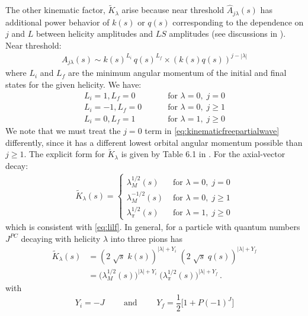 \documentclass[10pt, aps,prd,amsmath,amssymb,superscriptaddress,onecolumn,
nofootinbib,showpacs,preprintnumbers]{revtex4-1}
\newcommand{\mand}{\qquad \text{ and } \qquad}
\begin{document}
The other kinematic factor, \(\tilde{K}_{\lambda}\) arise  because near threshold \(\hat{A}_{j\lambda}(s)\) has additional power behavior of \(k(s)\) or \(q(s)\) corresponding to the dependence on \(j\) and \(L\) between helicity amplitudes and \(LS\) amplitudes (see discussions in \cite{Jackson1968,Franklin1966}). Near threshold:
  \begin{gather}
    A_{j\lambda}(s) \sim k(s)^{L_i} \, q(s)^{L_f} \times (k(s)q(s))^{j- |\lambda|}
  \end{gather}
where \(L_i\) and \(L_f\) are the minimum angular momentum of the initial and final states for the given helicity. We have:
  \begin{align}
      L_i = 1, L_f = 0 &\qquad  \text{ for } \lambda = 0, \; j = 0   \nonumber \\
      L_i = -1, L_f = 0 &\qquad  \text{ for } \lambda = 0, \;  j \label{eq:lilf} \geq 1  \\
      L_i = 0 , L_f = 1 & \qquad  \text{ for } \lambda = 1, \; j \geq 0 \nonumber
  \end{align}
We note that we must treat the \(j=0\) term in \cref{eq:kinematicfreepartialwave} differently, since it has a different lowest orbital angular momentum possible than \(j\geq 1\). The explicit form for \(\tilde{K}_{\lambda}\) is given by Table 6.1 in \cite{Collins}. For the axial-vector decay:
  \begin{align}
    \label{eq:k-factor-tilde}
    \tilde{K}_{\lambda}(s) =
    \begin{cases}
       \lambda^{1/2}_M(s)    &     \text{  for }\lambda = 0, \; j=0 \\
       \lambda^{-1/2}_M(s)  &\text{ for } \lambda = 0, \; j\geq 1 \\
       \lambda_\pi^{1/2}(s)     &\text{ for } \lambda = 1, \; j\geq 0
    \end{cases}
  \end{align}
which is consistent with \cref{eq:lilf}. In general, for a particle with quantum numbers \(J^{PC}\) decaying with helicity \(\lambda\) into three pions has
  \begin{align}
    \tilde{K}_{\lambda }(s) &=  (2 \; \sqrt{s} \; k(s))^{|\lambda| + Y_i} \; (2 \; \sqrt{s} \; q(s))^{|\lambda| + Y_f} \nonumber \\
    &=   \big(\lambda^{1/2}_M(s)\big)^{|\lambda| + Y_i} \; \big(\lambda_\pi^{1/2}(s)\big)^{|\lambda| + Y_f}\, .
  \end{align}
with
  \begin{equation}
    Y_i = - J \mand Y_f =  \frac{1}{2} \big[ 1 + P (-1)^J]
    \end{equation}
\end{document}
